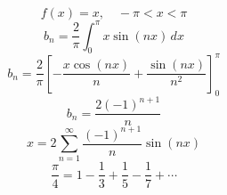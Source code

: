 \documentclass{article}
\begin{document}
\[
f(x)=x,\quad -\pi<x<\pi
\]
\[
b_n=\frac{2}{\pi}\int_0^{\pi}x\sin(nx)\,dx
\]
\[
b_n=\frac{2}{\pi}\left[-\frac{x\cos(nx)}{n}+\frac{\sin(nx)}{n^2}\right]_0^{\pi}
\]
\[
b_n=\frac{2(-1)^{n+1}}{n}
\]
\[
x=2\sum_{n=1}^{\infty}\frac{(-1)^{n+1}}{n}\sin(nx)
\]
\[
\frac{\pi}{4}=1-\frac{1}{3}+\frac{1}{5}-\frac{1}{7}+\cdots
\]
\end{document}
